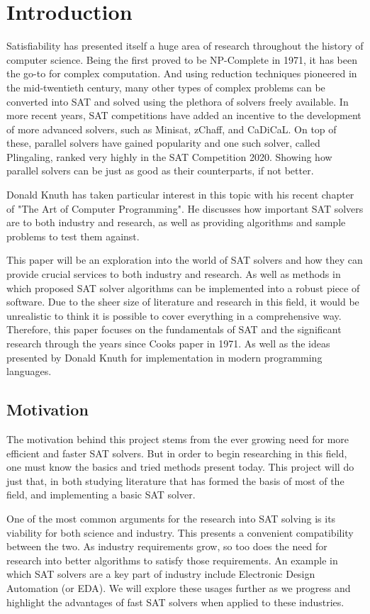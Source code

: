 \documentclass{article}
\begin{document}
\section{Introduction}
Satisfiability has presented itself a huge area of research throughout the history of computer
science. Being the first proved to be NP-Complete in 1971\cite{scook}, it has been the go-to for complex
computation. And using reduction techniques pioneered in the mid-twentieth century, many other types
of complex problems can be converted into SAT and solved using the plethora of solvers freely
available. In more recent years, SAT competitions have added an incentive to the development of more
advanced solvers, such as Minisat, zChaff, and CaDiCaL. On top of these, parallel solvers have
gained popularity and one such solver, called Plingaling, ranked very highly in the SAT Competition
2020. Showing how parallel solvers can be just as good as their counterparts, if not better.

Donald Knuth has taken particular interest in this topic with his recent chapter of "The Art of Computer Programming". He
discusses how important SAT solvers are to both industry and research, as well as providing algorithms and sample problems to
test them against.

This paper will be an exploration into the world of SAT solvers and how they can provide crucial services to both industry and
research. As well as methods in which proposed SAT solver algorithms can be implemented into a robust piece of software. Due to
the sheer size of literature and research in this field, it would be unrealistic to think it is possible to cover everything in a
comprehensive way. Therefore, this paper focuses on the fundamentals of SAT and the significant research through the years since
Cooks paper in 1971\cite{scook}. As well as the ideas presented by Donald Knuth for implementation in modern programming
languages.

\subsection{Motivation}
The motivation behind this project stems from the ever growing need for more efficient and faster SAT solvers. But in order to
begin researching in this field, one must know the basics and tried methods present today. This project will do just that, in
both studying literature that has formed the basis of most of the field, and implementing a basic SAT solver.

One of the most common arguments for the research into SAT solving is its viability for both science and industry. This presents
a convenient compatibility between the two. As industry requirements grow, so too does the need for research into better
algorithms to satisfy those requirements. An example in which SAT solvers are a key part of industry include Electronic Design
Automation (or EDA). We will explore these usages further as we progress and highlight the advantages of fast SAT solvers when
applied to these industries.
\end{document}
